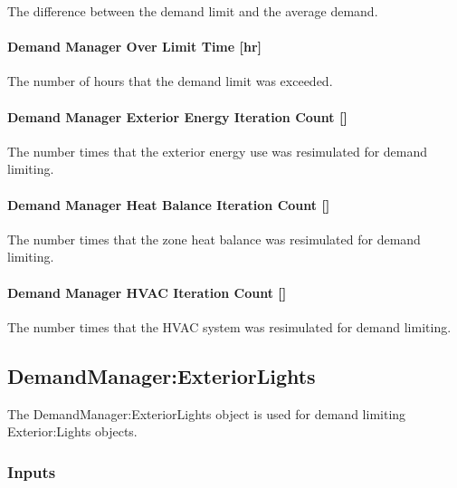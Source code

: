 The difference between the demand limit and the average demand.

\paragraph{Demand Manager Over Limit Time {[}hr{]}}\label{demand-manager-over-limit-time-hr}

The number of hours that the demand limit was exceeded.

\paragraph{\texorpdfstring{Demand Manager Exterior Energy Iteration Count {[]}}{Demand Manager Exterior Energy Iteration Count }}\label{demand-manager-exterior-energy-iteration-count}

The number times that the exterior energy use was resimulated for demand limiting.

\paragraph{\texorpdfstring{Demand Manager Heat Balance Iteration Count {[]}}{Demand Manager Heat Balance Iteration Count }}\label{demand-manager-heat-balance-iteration-count}

The number times that the zone heat balance was resimulated for demand limiting.

\paragraph{\texorpdfstring{Demand Manager HVAC Iteration Count {[]}}{Demand Manager HVAC Iteration Count }}\label{demand-manager-hvac-iteration-count}

The number times that the HVAC system was resimulated for demand limiting.

\subsection{DemandManager:ExteriorLights}\label{demandmanagerexteriorlights}

The DemandManager:ExteriorLights object is used for demand limiting Exterior:Lights objects.

\subsubsection{Inputs}\label{inputs-1-009}

